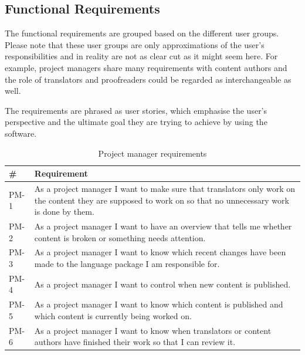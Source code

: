 

\subsection{Functional Requirements}
The functional requirements are grouped based on the different user groups. Please note that these user groups are only approximations of the user's responsibilities and in reality are not as clear cut as it might seem here. For example, project managers share many requirements with content authors and the role of translators and proofreaders could be regarded as interchangeable as well.

The requirements are phrased as user stories, which emphasise the user's perspective and the ultimate goal they are trying to achieve by using the software.


\begin{table}[h!]
\centering
\begin{tabular}{|l|p{12cm}|}
\hline
\rowcolor[HTML]{EFEFEF}
\textbf{\#} & \textbf{Requirement} \\ \hline
PM-1 & As a project manager I want to make sure that translators only work on the content they are supposed to work on so that no unnecessary work is done by them. \\ \hline
PM-2 & As a project manager I want to have an overview that tells me whether content is broken or something needs attention. \\ \hline
PM-3 & As a project manager I want to know which recent changes have been made to the language package I am responsible for. \\ \hline
PM-4 & As a project manager I want to control when new content is published. \\ \hline
PM-5 & As a project manager I want to know which content is published and which content is currently being worked on. \\ \hline
PM-6 & As a project manager I want to know when translators or content authors have finished their work so that I can review it. \\ \hline
\end{tabular}
\caption{Project manager requirements}
\label{my-label}
\end{table}

